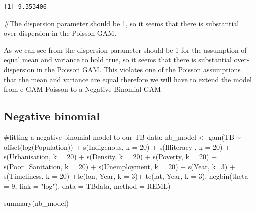 \documentclass[
  letterpaper,
  DIV=11,
  numbers=noendperiod]{scrartcl}
\newenvironment{Shaded}{\begin{snugshade}}{\end{snugshade}}
\newcommand{\AttributeTok}[1]{\textcolor[rgb]{0.40,0.45,0.13}{#1}}
\newcommand{\CommentTok}[1]{\textcolor[rgb]{0.37,0.37,0.37}{#1}}
\newcommand{\DecValTok}[1]{\textcolor[rgb]{0.68,0.00,0.00}{#1}}
\newcommand{\FunctionTok}[1]{\textcolor[rgb]{0.28,0.35,0.67}{#1}}
\newcommand{\NormalTok}[1]{\textcolor[rgb]{0.00,0.23,0.31}{#1}}
\newcommand{\OtherTok}[1]{\textcolor[rgb]{0.00,0.23,0.31}{#1}}
\newcommand{\SpecialCharTok}[1]{\textcolor[rgb]{0.37,0.37,0.37}{#1}}
\newcommand{\StringTok}[1]{\textcolor[rgb]{0.13,0.47,0.30}{#1}}
\begin{document}
\begin{verbatim}
[1] 9.353406
\end{verbatim}

\begin{Shaded}
\begin{Highlighting}[]
\CommentTok{\#The dispersion parameter should be 1, so it seems that there is substantial over{-}dispersion in the Poisson GAM.}
\end{Highlighting}
\end{Shaded}

As we can see from the dispersion parameter should be 1 for the
assumption of equal mean and variance to hold true, so it seems that
there is substantial over-dispersion in the Poisson GAM. This violates
one of the Poisson assumptions that the mean and variance are equal
therefore we will have to extend the model from e GAM Poisson to a
Negative Binomial GAM

\hypertarget{negative-binomial}{%
\subsection{Negative binomial}\label{negative-binomial}}

\begin{Shaded}
\begin{Highlighting}[]
\CommentTok{\#fitting a negative{-}binomial model to our TB data:}
\NormalTok{nb\_model }\OtherTok{\textless{}{-}} \FunctionTok{gam}\NormalTok{(TB }\SpecialCharTok{\textasciitilde{}} \FunctionTok{offset}\NormalTok{(}\FunctionTok{log}\NormalTok{(Population)) }\SpecialCharTok{+} \FunctionTok{s}\NormalTok{(Indigenous, }\AttributeTok{k =} \DecValTok{20}\NormalTok{) }\SpecialCharTok{+} \FunctionTok{s}\NormalTok{(Illiteracy , }\AttributeTok{k =} \DecValTok{20}\NormalTok{) }\SpecialCharTok{+} \FunctionTok{s}\NormalTok{(Urbanisation, }\AttributeTok{k =} \DecValTok{20}\NormalTok{) }\SpecialCharTok{+} \FunctionTok{s}\NormalTok{(Density, }\AttributeTok{k =} \DecValTok{20}\NormalTok{) }\SpecialCharTok{+} \FunctionTok{s}\NormalTok{(Poverty, }\AttributeTok{k =} \DecValTok{20}\NormalTok{) }\SpecialCharTok{+} \FunctionTok{s}\NormalTok{(Poor\_Sanitation, }\AttributeTok{k =} \DecValTok{20}\NormalTok{) }\SpecialCharTok{+} \FunctionTok{s}\NormalTok{(Unemployment, }\AttributeTok{k =} \DecValTok{20}\NormalTok{) }\SpecialCharTok{+} \FunctionTok{s}\NormalTok{(Year, }\AttributeTok{k=}\DecValTok{3}\NormalTok{) }\SpecialCharTok{+} \FunctionTok{s}\NormalTok{(Timeliness, }\AttributeTok{k =} \DecValTok{20}\NormalTok{) }\SpecialCharTok{+}\FunctionTok{te}\NormalTok{(lon, Year, }\AttributeTok{k =} \DecValTok{3}\NormalTok{)}\SpecialCharTok{+} \FunctionTok{te}\NormalTok{(lat, Year, }\AttributeTok{k =} \DecValTok{3}\NormalTok{), }\FunctionTok{negbin}\NormalTok{(}\AttributeTok{theta =} \DecValTok{9}\NormalTok{, }\AttributeTok{link =} \StringTok{"log"}\NormalTok{), }\AttributeTok{data =}\NormalTok{ TBdata, }\AttributeTok{method =} \StringTok{\textquotesingle{}REML\textquotesingle{}}\NormalTok{)}

\FunctionTok{summary}\NormalTok{(nb\_model)}
\end{Highlighting}
\end{Shaded}
\end{document}
